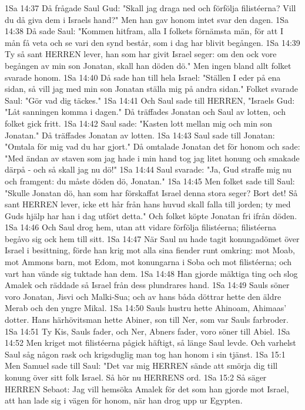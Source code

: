 1Sa 14:37  Då frågade Saul Gud: "Skall jag draga ned och förfölja filistéerna? Vill du då giva dem i Israels hand?" Men han gav honom intet svar den dagen.
1Sa 14:38  Då sade Saul: "Kommen hitfram, alla I folkets förnämsta män, för att I mån få veta och se vari den synd består, som i dag har blivit begången.
1Sa 14:39  Ty så sant HERREN lever, han som har givit Israel seger: om den ock vore begången av min son Jonatan, skall han döden dö." Men ingen bland allt folket svarade honom.
1Sa 14:40  Då sade han till hela Israel: "Ställen I eder på ena sidan, så vill jag med min son Jonatan ställa mig på andra sidan." Folket svarade Saul: "Gör vad dig täckes."
1Sa 14:41  Och Saul sade till HERREN, "Israels Gud: "Låt sanningen komma i dagen." Då träffades Jonatan och Saul av lotten, och folket gick fritt.
1Sa 14:42  Saul sade: "Kasten lott mellan mig och min son Jonatan." Då träffades Jonatan av lotten.
1Sa 14:43  Saul sade till Jonatan: "Omtala för mig vad du har gjort." Då omtalade Jonatan det för honom och sade: "Med ändan av staven som jag hade i min hand tog jag litet honung och smakade därpå - och så skall jag nu dö!"
1Sa 14:44  Saul svarade: "Ja, Gud straffe mig nu och framgent: du måste döden dö, Jonatan."
1Sa 14:45  Men folket sade till Saul: "Skulle Jonatan dö, han som har förskaffat Israel denna stora seger? Bort det! Så sant HERREN lever, icke ett hår från hans huvud skall falla till jorden; ty med Guds hjälp har han i dag utfört detta." Och folket köpte Jonatan fri ifrån döden.
1Sa 14:46  Och Saul drog hem, utan att vidare förfölja filistéerna; filistéerna begåvo sig ock hem till sitt.
1Sa 14:47  När Saul nu hade tagit konungadömet över Israel i besittning, förde han krig mot alla sina fiender runt omkring: mot Moab, mot Ammons barn, mot Edom, mot konungarna i Soba och mot filistéerna; och vart han vände sig tuktade han dem.
1Sa 14:48  Han gjorde mäktiga ting och slog Amalek och räddade så Israel från dess plundrares hand.
1Sa 14:49  Sauls söner voro Jonatan, Jisvi och Malki-Sua; och av hans båda döttrar hette den äldre Merab och den yngre Mikal.
1Sa 14:50  Sauls hustru hette Ahinoam, Ahimaas' dotter. Hans härhövitsman hette Abiner, son till Ner, som var Sauls farbroder.
1Sa 14:51  Ty Kis, Sauls fader, och Ner, Abners fader, voro söner till Abiel.
1Sa 14:52  Men kriget mot filistéerna pågick häftigt, så länge Saul levde. Och varhelst Saul såg någon rask och krigsduglig man tog han honom i sin tjänst.
1Sa 15:1  Men Samuel sade till Saul: "Det var mig HERREN sände att smörja dig till konung över sitt folk Israel. Så hör nu HERRENS ord.
1Sa 15:2  Så säger HERREN Sebaot: Jag vill hemsöka Amalek för det som han gjorde mot Israel, att han lade sig i vägen för honom, när han drog upp ur Egypten.

